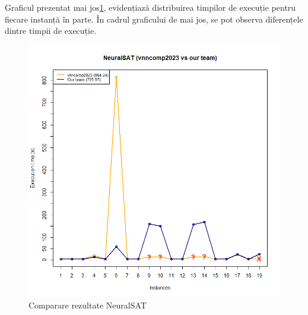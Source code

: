 Graficul prezentat mai jos\ref{fig:image4}, evidențiază distribuirea timpilor de execuție pentru fiecare instanță în parte. În cadrul graficului de mai jos, se pot observa diferențele dintre timpii de execuție.
\begin{figure}[h]
\centering 
\includegraphics[width=0.8\linewidth]{imagini/interpretare rezultate/NeuralSAT_us_vs_vnncomp2023.png}
\caption{Comparare rezultate NeuralSAT}
\label{fig:image4} 
\end{figure}
\